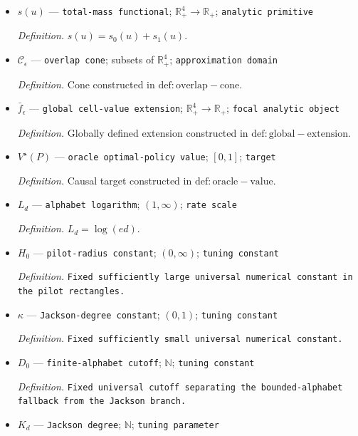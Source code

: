 \documentclass{article}
\begin{document}
\begin{itemize}
  \par\smallskip\noindent\emph{Definition.} \(s_a(u)=u_{a0}+u_{a1}\).
  \item \(s(u)\) --- \texttt{total-\allowbreak{}mass functional}; \(\mathbb R_+^4\to\mathbb R_+\); \texttt{analytic primitive}
  \par\smallskip\noindent\emph{Definition.} \(s(u)=s_0(u)+s_1(u)\).
  \item \(\mathcal C_\epsilon\) --- \texttt{overlap cone}; subsets of \(\mathbb R_+^4\); \texttt{approximation domain}
  \par\smallskip\noindent\emph{Definition.} Cone constructed in \(\mathrm{def:overlap-cone}\).
  \item \(\bar f_\epsilon\) --- \texttt{global cell-\allowbreak{}value extension}; \(\mathbb R_+^4\to\mathbb R_+\); \texttt{focal analytic object}
  \par\smallskip\noindent\emph{Definition.} Globally defined extension constructed in \(\mathrm{def:global-extension}\).
  \item \(V^\star(P)\) --- \texttt{oracle optimal-\allowbreak{}policy value}; \([0,1]\); \texttt{target}
  \par\smallskip\noindent\emph{Definition.} Causal target constructed in \(\mathrm{def:oracle-value}\).
  \item \(L_d\) --- \texttt{alphabet logarithm}; \((1,\infty)\); \texttt{rate scale}
  \par\smallskip\noindent\emph{Definition.} \(L_d=\log(ed)\).
  \item \(H_0\) --- \texttt{pilot-\allowbreak{}radius constant}; \((0,\infty)\); \texttt{tuning constant}
  \par\smallskip\noindent\emph{Definition.} \texttt{Fixed sufficiently large universal numerical constant in the pilot rectangles.}
  \item \(\kappa\) --- \texttt{Jackson-\allowbreak{}degree constant}; \((0,1)\); \texttt{tuning constant}
  \par\smallskip\noindent\emph{Definition.} \texttt{Fixed sufficiently small universal numerical constant.}
  \item \(D_0\) --- \texttt{finite-\allowbreak{}alphabet cutoff}; \(\mathbb N\); \texttt{tuning constant}
  \par\smallskip\noindent\emph{Definition.} \texttt{Fixed universal cutoff separating the bounded-\allowbreak{}alphabet fallback from the Jackson branch.}
  \item \(K_d\) --- \texttt{Jackson degree}; \(\mathbb N\); \texttt{tuning parameter}

\end{itemize}
\end{document}
